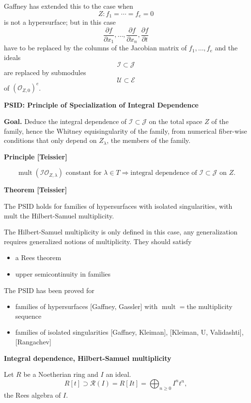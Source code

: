 Gaffney has extended this to the case
when
$$
Z:f_1=\cdots=f_e=0
$$
is not a hypersurface; but in this case
$$
\frac{\partial f}{\partial x_1},
\ldots,
\frac{\partial f}{\partial x_n},
\frac{\partial f}{\partial t}
$$
have to be replaced by the columns of the
Jacobian matrix of $f_1,\ldots,f_e$ and
the ideals
$$
\mathcal{I}\subset\mathcal{J}
$$
are replaced by submodules
$$
\mathcal{U}\subset\mathcal{E}
$$
of $(\mathcal{O}_{Z,0})^e$.

\medskip\noindent
{\bf PSID: Principle of Specialization of
Integral Dependence}

\medskip\noindent
{\bf Goal.}
Deduce the integral dependence of
$\mathcal{I}\subset\mathcal{J}$ on the
total space $Z$ of the family, hence the
Whitney equisingularity of the family,
from numerical fiber-wise conditions that
only depend on $Z_\lambda$, the members of
the family.

\medskip\noindent
{\bf Principle [Teissier]}

$$
\operatorname{mult}
(\mathcal{I}\mathcal{O}_{Z,\lambda})
\text{ constant for }\lambda\in T
\Longrightarrow
\text{integral dependence of }
\mathcal{I}\subset\mathcal{J}
\text{ on }Z.
$$

\medskip\noindent
{\bf Theorem [Teissier]}

The PSID holds for families of
hypersurfaces with isolated
singularities, with mult the
Hilbert-Samuel multiplicity.

The Hilbert-Samuel multiplicity is only
defined in this case, any generalization
requires generalized notions of
multiplicity. They should satisfy
\begin{itemize}
\item a Rees theorem
\item upper semicontinuity in families
\end{itemize}

The PSID has been proved for
\begin{itemize}
\item families of hypersurfaces
[Gaffney, Gassler] with
$\operatorname{mult}=$the multiplicity
sequence
\item families of isolated singularities
[Gaffney, Kleiman],
[Kleiman, U, Validashti],
[Rangachev]
\end{itemize}

\medskip\noindent
{\bf Integral dependence, Hilbert-Samuel
multiplicity}

Let $R$ be a Noetherian ring and $I$ an
ideal.
$$
R[t]\supset
\mathcal{R}(I)
=
R[It]
=
\bigoplus_{n\geq 0}I^nt^n,
$$
the Rees algebra of $I$.

